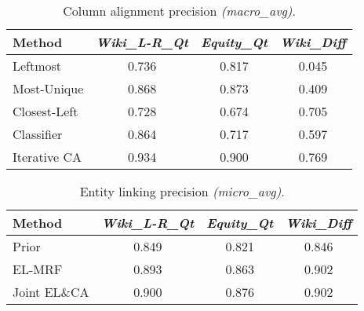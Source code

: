 
\begin{table}[t]

	\centering
		\caption{Column alignment precision \textit{(macro\_avg)}.}
	\label{tab:prec_cl}
	\vspace{\tsq}
		\begin{tabular}{l|ccc}
			    \hline
	    Method &\textit{Wiki\_L-R\_Qt} & \textit{Equity\_Qt} & \textit{Wiki\_Diff}\\ 
			    \hline
		 Leftmost & 0.736 & 0.817 & 0.045\\
 		 Most-Unique & 0.868 & 0.873 & 0.409\\
 		 Closest-Left & 0.728 & 0.674 & 0.705 \\
 		 Classifier \cite{DBLP:journals/pvldb/VenetisHMPSWMW11} & 0.864  & 0.717 & 0.597 \\
		 Iterative CA & 0.934 & 0.900 & 0.769\\ 
			    \hline
		\end{tabular}
	
\end{table}
\begin{table}[t]
	\centering
		\caption{Entity linking precision \textit{(micro\_avg)}.}
	\label{tab:prec_ed}
	\vspace{\tsq}
		\begin{tabular}{l|ccc} 
			    \hline
	    Method &\textit{Wiki\_L-R\_Qt} & \textit{Equity\_Qt} & \textit{Wiki\_Diff}\\
			    \hline
		  Prior & 0.849 & 0.821 & 0.846\\
		 EL-MRF \cite{DBLP:conf/semweb/BhagavatulaND15} & 0.893 & 0.863 & 0.902\\
		 Joint EL\&CA & 0.900& 0.876 & 0.902\\
			    \hline
		\end{tabular}
\end{table}
